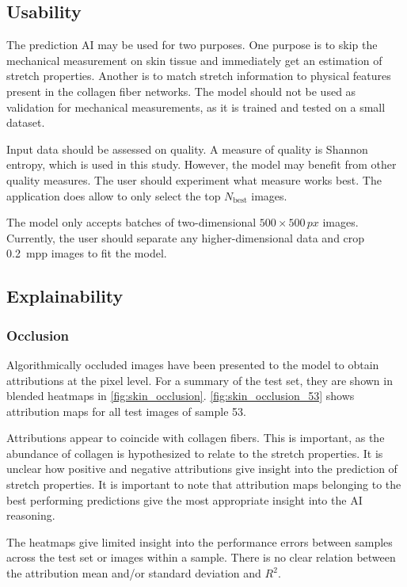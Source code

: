 \subsection{Usability}
The prediction AI may be used for two purposes.
One purpose is to skip the mechanical measurement on skin tissue and immediately get an estimation of stretch properties.
Another is to match stretch information to physical features present in the collagen fiber networks.
The model should not be used as validation for mechanical measurements, as it is trained and tested on a small dataset.

Input data should be assessed on quality.
A measure of quality is Shannon entropy, which is used in this study.
However, the model may benefit from other quality measures.
The user should experiment what measure works best.
The application does allow to only select the top $N_\mathrm{best}$ images.

The model only accepts batches of two-dimensional $500 \times 500\,\unit{px}$ images.
Currently, the user should separate any higher-dimensional data and crop \qty{0.2}{mpp} images to fit the model.

\subsection{Explainability}

\subsubsection{Occlusion}
Algorithmically occluded images have been presented to the model to obtain attributions at the pixel level.
For a summary of the test set, they are shown in blended heatmaps in \cref{fig:skin_occlusion}.
\cref{fig:skin_occlusion_53} shows attribution maps for all test images of sample 53.

Attributions appear to coincide with collagen fibers.
This is important, as the abundance of collagen is hypothesized to relate to the stretch properties.
It is unclear how positive and negative attributions give insight into the prediction of stretch properties.
It is important to note that attribution maps belonging to the best performing predictions give the most appropriate insight into the AI reasoning.

The heatmaps give limited insight into the performance errors between samples across the test set or images within a sample.
There is no clear relation between the attribution mean and/or standard deviation and $R^2$.

